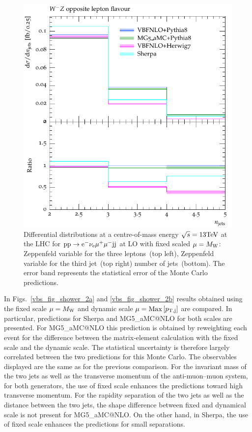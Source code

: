 \documentclass[11pt]{cernrep}
\makeatletter
\newcommand{\MGaMC}{M\protect\scalebox{0.8}{AD}G\protect\scalebox{0.8}{RAPH}5\_aMC@NLO\xspace}
\makeatother
\begin{document}
\begin{figure}[htbp]
\begin{center}
   \includegraphics[scale=0.65]{figs/VBFNLO_WmZ_OF_nJets}
\caption{Differential distributions at a centre-of-mass energy $\sqrt{s}=13{\rm TeV}$ at the LHC for ${\rm p} {\rm p}
  \to {\rm e}^-  \nu_{\rm e}  \mu^+ \mu^- {\rm j} {\rm j}$ at LO with fixed scaled $\mu = M_{\rm W}$: 
                Zeppenfeld variable for the three leptons~(top left),
                Zeppenfeld variable for the third jet~(top right)
                number of jets~(bottom). The error band represents
                the statistical error of the Monte Carlo predictions. }
\label{vbs_fig_shower_1b}
\end{center}
\end{figure}

In Figs.~\ref{vbs_fig_shower_2a} and \ref{vbs_fig_shower_2b} results obtained using the fixed scale $\mu = M_{\rm W}$ and dynamic scale $\mu = {\rm Max}\left[p_{\rm T, j}\right]$ are compared.
In particular, predictions for {\sc Sherpa} and \MGaMC for both scales are presented. For
\MGaMC this prediction is obtained by reweighting each event for the difference between the matrix-element calculation
with the fixed scale and the dynamic scale. The statistical uncertainty is therefore largely
correlated between the two predictions for this Monte Carlo.  
The observables displayed are the same as for the previous comparison.
For the invariant mass of the two jets as well as the transverse momentum of the anti-muon--muon system, for both generators, the use of fixed scale enhances the predictions toward high transverse momentum.
For the rapidity separation of the two jets as well as the distance between the two jets, the shape difference between fixed and dynamical scale is not present for \MGaMC.
On the other hand, in {\sc Sherpa}, the use of fixed scale enhances the predictions for small separations.
\end{document}
